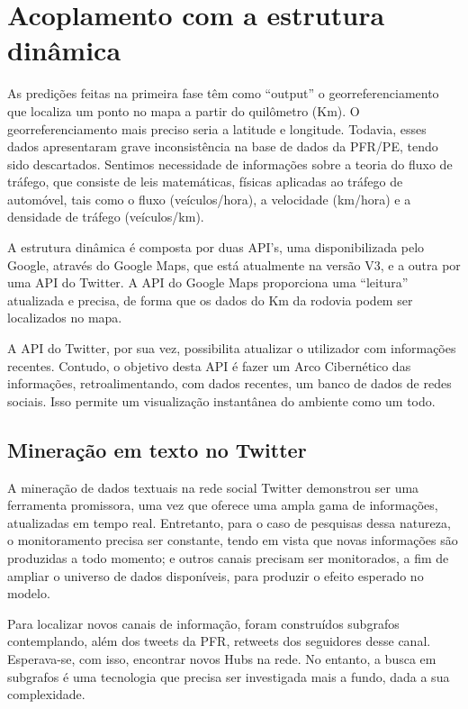\pagebreak

\section{Acoplamento com a estrutura dinâmica}

As predições feitas na primeira fase têm como ``output'' o georreferenciamento que localiza um ponto no mapa a partir do quilômetro (Km). O georreferenciamento mais preciso seria a latitude e longitude. Todavia, esses dados apresentaram grave inconsistência na base de dados da PFR/PE, tendo sido descartados. Sentimos necessidade de informações sobre a teoria do fluxo de tráfego, que consiste de leis matemáticas, físicas aplicadas ao tráfego de automóvel, tais como o fluxo (veículos/hora), a velocidade (km/hora) e a densidade de tráfego (veículos/km).

A estrutura dinâmica é composta por duas API's, uma disponibilizada pelo Google, através do Google Maps, que está atualmente na versão V3, e a
outra por uma API do Twitter. A API do Google Maps proporciona uma ``leitura'' atualizada e precisa, de forma que os dados do Km da rodovia podem ser localizados no mapa.

A API do Twitter, por sua vez, possibilita atualizar o utilizador com informações recentes. Contudo, o objetivo desta API é fazer 
um Arco Cibernético das informações, retroalimentando, com dados recentes, um banco de dados de redes sociais. Isso permite um visualização 
instantânea do ambiente como um todo.

\pagebreak

\subsection{Mineração em texto no Twitter}

A mineração de dados textuais na rede social Twitter demonstrou ser uma ferramenta promissora, uma vez que oferece uma ampla gama de informações, atualizadas em tempo real. Entretanto, para o caso de pesquisas dessa natureza, o monitoramento precisa ser constante, tendo em vista que novas informações são produzidas a todo momento; e outros canais precisam ser monitorados, a fim de ampliar o universo de dados disponíveis, para produzir o efeito esperado no modelo.

Para localizar novos canais de informação, foram construídos subgrafos contemplando, além dos tweets da PFR, retweets dos seguidores desse canal. Esperava-se, com isso, encontrar novos Hubs na rede. No entanto, a busca em subgrafos é uma tecnologia que precisa ser investigada mais a fundo, dada a sua complexidade.

